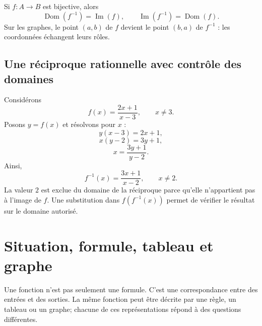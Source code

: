 \documentclass[12pt,a4paper,openany]{book}
\newcommand{\dom}{\operatorname{Dom}}
\newcommand{\im}{\operatorname{Im}}
\begin{document}
\begin{center}
\qquad
{}
\end{center}

\begin{connectionbox}
Si $f:A\to B$ est bijective, alors
\[
\dom(f^{-1})=\im(f),
\qquad
\im(f^{-1})=\dom(f).
\]
Sur les graphes, le point $(a,b)$ de $f$ devient le point $(b,a)$ de $f^{-1}$ : les coordonnées échangent leurs rôles.
\end{connectionbox}

\subsection{Une réciproque rationnelle avec contrôle des domaines}

Considérons
\[
f(x)=\frac{2x+1}{x-3},
\qquad x\ne3.
\]
Posons $y=f(x)$ et résolvons pour $x$ :
\[
y(x-3)=2x+1,
\]
\[
x(y-2)=3y+1,
\]
\[
x=\frac{3y+1}{y-2}.
\]
Ainsi,
\[
f^{-1}(x)=\frac{3x+1}{x-2},
\qquad x\ne2.
\]
La valeur $2$ est exclue du domaine de la réciproque parce qu'elle n'appartient pas à l'image de $f$. Une substitution dans $f(f^{-1}(x))$ permet de vérifier le résultat sur le domaine autorisé.


\section{Situation, formule, tableau et graphe}

\begin{visualbox}
Une fonction n'est pas seulement une formule. C'est une correspondance entre des entrées et des sorties. La même fonction peut être décrite par une règle, un tableau ou un graphe; chacune de ces représentations répond à des questions différentes.
\end{visualbox}
\end{document}
